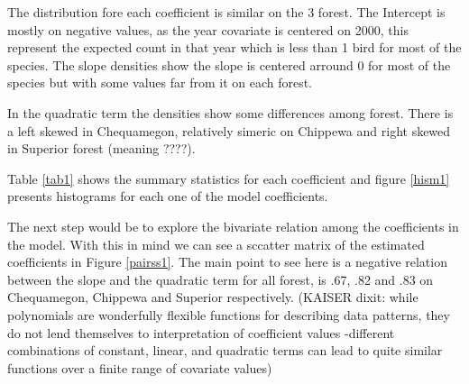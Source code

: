 \documentclass{article}
\begin{document}
The distribution fore each coefficient is similar on the 3 forest. The Intercept is mostly on negative values, as the year covariate is centered on 2000, this represent the expected count in that year which is  less than 1 bird for most of the species. The slope densities show the slope is centered arround 0 for most of the species but with some values far from it on each forest. 

In the quadratic term the densities show some differences among forest. There is a left skewed in Chequamegon, relatively simeric on Chippewa and right skewed in Superior forest (meaning ????). 

Table \ref{tab1} shows the summary statistics for each coefficient and figure \ref{hism1} presents histograms for each one of the model coefficients.


The next step would be to explore the bivariate relation among the coefficients in the model. With this in mind we can see a sccatter matrix of the estimated coefficients in Figure \ref{pairss1}. The main point to see here is a negative relation between the slope and the quadratic term for all forest, is .67, .82 and .83 on Chequamegon, Chippewa and Superior respectively. (KAISER dixit: while polynomials are wonderfully flexible functions for describing data patterns, they do not lend themselves to interpretation of coefficient values -different combinations of constant, linear, and quadratic terms can lead to quite similar functions over a finite range of covariate values) 
\end{document}

